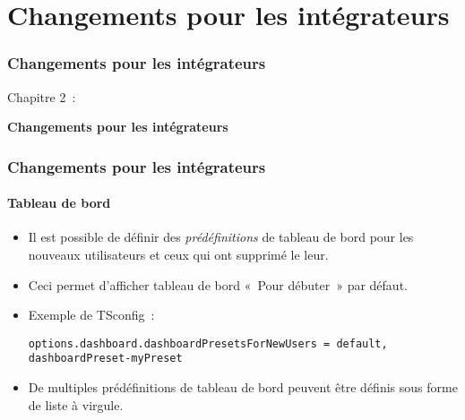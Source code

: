 %

\section{Changements pour les intégrateurs}
\begin{frame}[fragile]
	\frametitle{Changements pour les intégrateurs}

	\begin{center}\huge{Chapitre 2~:}\end{center}
	\begin{center}\huge{\color{typo3darkgrey}\textbf{Changements pour les intégrateurs}}\end{center}

\end{frame}


\begin{frame}[fragile]
	\frametitle{Changements pour les intégrateurs}
	\framesubtitle{Tableau de bord}

	\lstset{basicstyle=\tiny\ttfamily}

	\begin{itemize}
		\item Il est possible de définir des \textit{prédéfinitions} de tableau de bord
			pour les nouveaux utilisateurs et ceux qui ont supprimé le leur.
		\item Ceci permet d'afficher tableau de bord «~Pour débuter~» par défaut.
		\item Exemple de TSconfig~:

\vspace{-0.4cm}
\begin{lstlisting}
options.dashboard.dashboardPresetsForNewUsers = default, dashboardPreset-myPreset
\end{lstlisting}

		\item De multiples prédéfinitions de tableau de bord peuvent être définis sous
			forme de liste à virgule.

	\end{itemize}

\end{frame}

